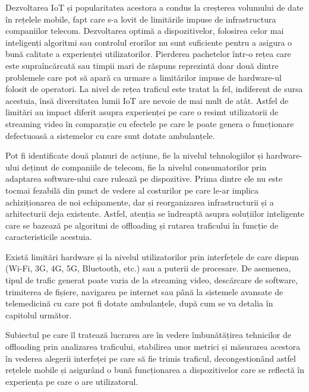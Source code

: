 \documentclass[12pt,a4paper]{report}
\begin{document}
Dezvoltarea IoT și popularitatea acestora a condus la creșterea volumului de date în rețelele mobile, fapt care s-a lovit de limitările impuse de infrastructura companiilor telecom. Dezvoltarea optimă a dispozitivelor, folosirea celor mai inteligenți algoritmi sau controlul erorilor nu sunt suficiente pentru a asigura o bună calitate a experienței utilizatorilor. Pierderea pachetelor într-o rețea care este supraîncărcată sau timpii mari de răspuns reprezintă doar două dintre problemele care pot să apară ca urmare a limitărilor impuse de hardware-ul folosit de operatori. La nivel de rețea traficul este tratat la fel, indiferent de sursa acestuia, însă diversitatea lumii IoT are nevoie de mai mult de atât. Astfel de limitări au impact diferit asupra experienței pe care o resimt utilizatorii de streaming video în comparație cu efectele pe care le poate genera o funcționare defectuoasă a sistemelor cu care sunt dotate ambulanțele.

Pot fi identificate două planuri de acțiune, fie la nivelul tehnologiilor și hardware-ului deținut de companiile de telecom, fie la nivelul consumatorilor prin adaptarea software-ului care rulează pe dispozitive. Prima dintre ele nu este tocmai fezabilă din punct de vedere al costurilor pe care le-ar implica achiziționarea de noi echipamente, dar și reorganizarea infrastructurii și a arhitecturii deja existente. Astfel, atenția se îndreaptă asupra soluțiilor inteligente care se bazează pe algoritmi de offloading și rutarea traficului în funcție de caracteristicile acestuia.

Există limitări hardware și la nivelul utilizatorilor prin interfețele de care dispun (Wi-Fi, 3G, 4G, 5G, Bluetooth, etc.) sau a puterii de procesare. De asemenea, tipul de trafic generat poate varia de la streaming video, descărcare de software, trimiterea de fișiere, navigarea pe internet sau până la sistemele avansate de telemedicină cu care pot fi dotate ambulanțele, după cum se va detalia în capitolul următor.

Subiectul pe care îl tratează lucrarea are în vedere îmbunătățirea tehnicilor de offloading prin analizarea traficului, stabilirea unor metrici și măsurarea acestora în vederea alegerii interfeței pe care să fie trimis traficul, decongestionând astfel rețelele mobile și asigurând o bună funcționarea a dispozitivelor care se reflectă în experiența pe care o are utilizatorul.
\end{document}
